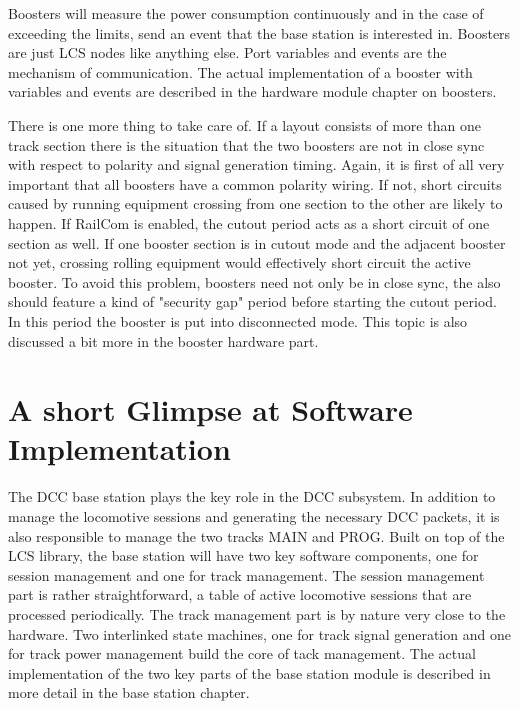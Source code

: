 \begin{center}
\end{center}

    
Boosters will measure the power consumption continuously and in the case of exceeding the limits, send an event that the base station is interested in. Boosters are just LCS nodes like anything else. Port variables and events are the mechanism of communication. The actual implementation of a booster with variables and events are described in the hardware module chapter on boosters.

There is one more thing to take care of. If a layout consists of more than one track section there is the situation that the two boosters are not in close sync with respect to polarity and signal generation timing. Again, it is first of all very important that all boosters have a common polarity wiring. If not, short circuits caused by running equipment crossing from one section to the other are likely to happen. If RailCom is enabled, the cutout period acts as a short circuit of one section as well. If one booster section is in cutout mode and the adjacent booster not yet, crossing rolling equipment would effectively short circuit the active booster. To avoid this problem, boosters need not only be in close sync, the also should feature a kind of "security gap" period before starting the cutout period. In this period the booster is put into disconnected mode. This topic is also discussed a bit more in the booster hardware part.

\section{A short Glimpse at Software Implementation}

The DCC base station plays the key role in the DCC subsystem. In addition to manage the locomotive sessions and generating the necessary DCC packets, it is also responsible to manage the two tracks MAIN and PROG. Built on top of the LCS library, the base station will have two key software components, one for session management and one for track management. The session management part is rather straightforward, a table of active locomotive sessions that are processed periodically. The track management part is by nature very close to the hardware. Two interlinked state machines, one for track signal generation and one for track power management build the core of tack management. The actual implementation of the two key parts of the base station module is described in more detail in the base station chapter.

